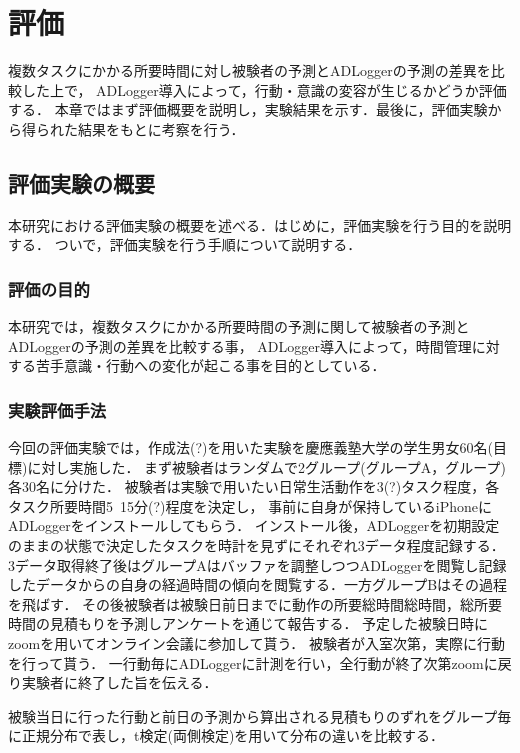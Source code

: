 \chapter{評価}
複数タスクにかかる所要時間に対し被験者の予測とADLoggerの予測の差異を比較した上で，
ADLogger導入によって，行動・意識の変容が生じるかどうか評価する．
本章ではまず評価概要を説明し，実験結果を示す．最後に，評価実験から得られた結果をもとに考察を行う．

\section{評価実験の概要}
本研究における評価実験の概要を述べる．はじめに，評価実験を行う目的を説明する．
ついで，評価実験を行う手順について説明する．

\subsection{評価の目的}
本研究では，複数タスクにかかる所要時間の予測に関して被験者の予測とADLoggerの予測の差異を比較する事，
ADLogger導入によって，時間管理に対する苦手意識・行動への変化が起こる事を目的としている．

\subsection{実験評価手法}
今回の評価実験では，作成法\cite{Oguro1961}\cite{Tayama2018}(?)を用いた実験を慶應義塾大学の学生男女60名(目標)に対し実施した．
まず被験者はランダムで2グループ(グループA，グループ)各30名に分けた．
被験者は実験で用いたい日常生活動作を3(?)タスク程度，各タスク所要時間5~15分(?)程度を決定し，
事前に自身が保持しているiPhoneにADLoggerをインストールしてもらう．
インストール後，ADLoggerを初期設定のままの状態で決定したタスクを時計を見ずにそれぞれ3データ程度記録する．
3データ取得終了後はグループAはバッファを調整しつつADLoggerを閲覧し記録したデータからの自身の経過時間の傾向を閲覧する．一方グループBはその過程を飛ばす．
その後被験者は被験日前日までに動作の所要総時間総時間，総所要時間の見積もりを予測しアンケートを通じて報告する．
予定した被験日時にzoom\cite{zoom}を用いてオンライン会議に参加して貰う．
被験者が入室次第，実際に行動を行って貰う．
一行動毎にADLoggerに計測を行い，全行動が終了次第zoomに戻り実験者に終了した旨を伝える．

被験当日に行った行動と前日の予測から算出される見積もりのずれをグループ毎に正規分布で表し，t検定(両側検定)を用いて分布の違いを比較する．

